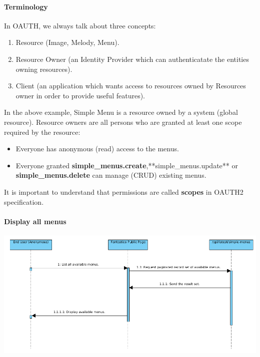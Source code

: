 \documentclass[letterpaper,10pt,english]{sphinxmanual}
\begin{document}
\paragraph{Terminology}
\label{features/oauth2/simple_api_example:terminology}
In OAUTH, we always talk about three concepts:
\begin{enumerate}
\item {} 
Resource (Image, Melody, Menu).

\item {} 
Resource Owner (an Identity Provider which can authenticatate the entities owning resources).

\item {} 
Client (an application which wants access to resources owned by Resources owner in order to provide useful features).

\end{enumerate}

In the above example, Simple Menu is a resource owned by a system (global resource). Resource owners are all persons who
are granted at least one scope required by the resource:
\begin{itemize}
\item {} 
Everyone has anonymous (read) access to the menus.

\item {} 
Everyone granted \textbf{simple\_menus.create},**simple\_menus.update** or \textbf{simple\_menus.delete} can manage (CRUD) existing menus.

\end{itemize}

It is important to understand that permissions are called \textbf{scopes} in OAUTH2 specification.


\paragraph{Display all menus}
\label{features/oauth2/simple_api_example:display-all-menus}
\includegraphics{simple_menu_read.png}
\end{document}
